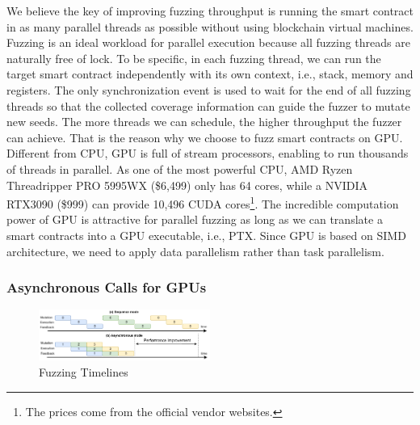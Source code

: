 We believe the key of improving fuzzing throughput is running the smart contract in as many parallel threads as possible without using blockchain virtual machines. 
%
Fuzzing is an ideal workload for parallel execution because all fuzzing threads are naturally free of lock.
To be specific, in each fuzzing thread, we can run the target smart contract independently with its own context, i.e., stack, memory and registers. 
The only synchronization event is used to wait for the end of all fuzzing threads so that the collected coverage information can guide the fuzzer to mutate new seeds.
%
The more threads we can schedule, the higher throughput the fuzzer can achieve.
That is the reason why we choose to fuzz smart contracts on GPU. 
Different from CPU, GPU is full of stream processors, enabling to run thousands of threads in parallel. 
%
As one of the most powerful CPU, AMD Ryzen Threadripper PRO 5995WX (\$6,499) only has 64 cores, while a NVIDIA RTX3090 (\$999) can provide 10,496 CUDA cores\footnote{The prices come from the official vendor websites.}. 
The incredible computation power of GPU is attractive for parallel fuzzing as long as we can translate a smart contracts into a GPU executable, i.e., PTX\cite{ptx2021doc}. 
%
Since GPU is based on SIMD architecture, we need to apply data parallelism rather than task parallelism.



%





\subsubsection{Asynchronous Calls for GPUs}

\begin{figure}[t]
\centerline{\includegraphics[width=0.5\textwidth]{images/GFL-async_cpy.drawio.pdf}}
\caption{Fuzzing Timelines}
\vspace{-0.1in}
\label{fig:async_cpy}
\end{figure}

